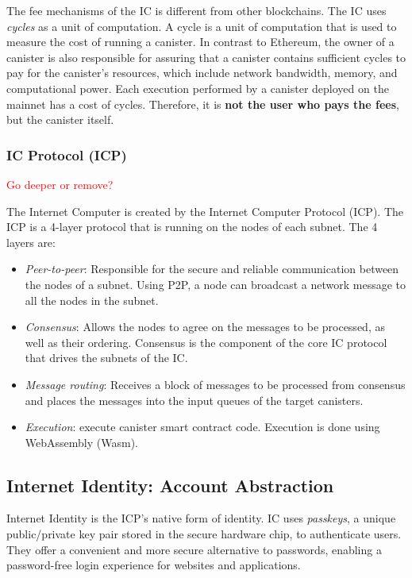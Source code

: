 The fee mechanisms of the IC is different from other blockchains. The IC uses \textit{cycles} as a unit of computation. A cycle is a unit of computation that is used to measure the cost of running a canister. In contrast to Ethereum, the owner of a canister is also responsible for assuring that a canister contains sufficient cycles to pay for the canister's resources, which include network bandwidth, memory, and computational power. Each execution performed by a canister deployed on the mainnet has a cost of cycles. Therefore, it is \textbf{not the user who pays the fees}, but the canister itself. \cite{icp-developer-journey}

\subsubsection{IC Protocol (ICP)}

\textcolor{red}{Go deeper or remove?}

The Internet Computer is created by the Internet Computer Protocol (ICP). The ICP is a 4-layer protocol that is running on the nodes of each subnet. The 4 layers are: \cite{icp-how-it-works}

\begin{itemize}
    \item \textit{Peer-to-peer}: Responsible for the secure and reliable communication between the nodes of a subnet. Using P2P, a node can broadcast a network message to all the nodes in the subnet.
    \item \textit{Consensus}: Allows the nodes to agree on the messages to be processed, as well as their ordering. Consensus is the component of the core IC protocol that drives the subnets of the IC.
    \item \textit{Message routing}: Receives a block of messages to be processed from consensus and places the messages into the input queues of the target canisters.
    \item \textit{Execution}: execute canister smart contract code. Execution is done using WebAssembly (Wasm). 
\end{itemize}


\subsection{Internet Identity: Account Abstraction}

Internet Identity is the ICP's native form of identity. IC uses \textit{passkeys}, a unique public/private key pair stored in the secure hardware chip, to authenticate users. They offer a convenient and more secure alternative to passwords, enabling a password-free login experience for websites and applications. \cite{icp-identity}

